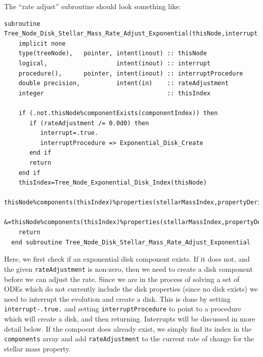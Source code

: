 The ``rate adjust'' subroutine should look something like:
\begin{lstlisting}[escapechar=@,breaklines,prebreak=\&,postbreak=\&]
  subroutine Tree_Node_Disk_Stellar_Mass_Rate_Adjust_Exponential(thisNode,interrupt,interruptProcedure,rateAdjustment)
    implicit none
    type(treeNode),   pointer, intent(inout) :: thisNode
    logical,                   intent(inout) :: interrupt
    procedure(),      pointer, intent(inout) :: interruptProcedure
    double precision,          intent(in)    :: rateAdjustment
    integer                                  :: thisIndex
    
    if (.not.thisNode%componentExists(componentIndex)) then
       if (rateAdjustment /= 0.0d0) then
          interrupt=.true.
          interruptProcedure => Exponential_Disk_Create
       end if
       return
    end if
    thisIndex=Tree_Node_Exponential_Disk_Index(thisNode)
    thisNode%components(thisIndex)%properties(stellarMassIndex,propertyDerivative)&
         &=thisNode%components(thisIndex)%properties(stellarMassIndex,propertyDerivative)+rateAdjustment
    return
  end subroutine Tree_Node_Disk_Stellar_Mass_Rate_Adjust_Exponential
\end{lstlisting}
Here, we first check if an exponential disk component exists. If it does not, and the given {\tt rateAdjustment} is non-zero, then we need to create a disk component before we can adjust the rate. Since we are in the process of solving a set of ODEs which do not currently include the disk properties (since no disk exists) we need to interrupt the evolution and create a disk. This is done by setting {\tt interrupt-.true.} and setting {\tt interruptProcedure} to point to a procedure which will create a disk, and then returning. Interrupts will be discussed in more detail below. If the compoent does already exist, we simply find its index in the {\tt components} array and add {\tt rateAdjustment} to the current rate of change for the stellar mass property.

